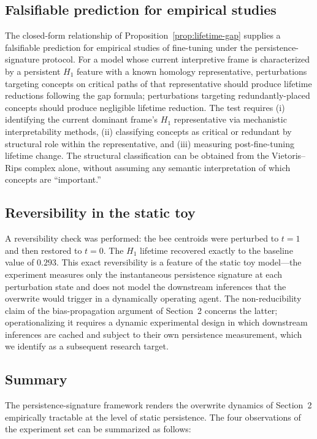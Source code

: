\documentclass[12pt]{article}
\begin{document}
\subsection*{Falsifiable prediction for empirical studies}

The closed-form relationship of
Proposition~\ref{prop:lifetime-gap} supplies a falsifiable
prediction for empirical studies of fine-tuning under the
persistence-signature protocol. For a model whose current
interpretive frame is characterized by a persistent $H_1$ feature
with a known homology representative, perturbations targeting
concepts on critical paths of that representative should produce
lifetime reductions following the gap formula; perturbations
targeting redundantly-placed concepts should produce negligible
lifetime reduction. The test requires (i) identifying the current
dominant frame's $H_1$ representative via mechanistic
interpretability methods, (ii) classifying concepts as critical or
redundant by structural role within the representative, and
(iii) measuring post-fine-tuning lifetime change. The structural
classification can be obtained from the Vietoris--Rips complex
alone, without assuming any semantic interpretation of which
concepts are ``important.''

\subsection*{Reversibility in the static toy}

A reversibility check was performed: the bee centroids were
perturbed to $t = 1$ and then restored to $t = 0$. The $H_1$
lifetime recovered exactly to the baseline value of $0.293$. This
exact reversibility is a feature of the static toy model---the
experiment measures only the instantaneous persistence signature
at each perturbation state and does not model the downstream
inferences that the overwrite would trigger in a dynamically
operating agent. The non-reducibility claim of the bias-propagation argument of Section~2 concerns the latter; operationalizing
it requires a dynamic experimental design in which downstream
inferences are cached and subject to their own persistence
measurement, which we identify as a subsequent research target.

\subsection*{Summary}

The persistence-signature framework renders the overwrite dynamics
of Section~2 empirically tractable at the level
of static persistence. The four observations of the experiment set
can be summarized as follows:
\end{document}
